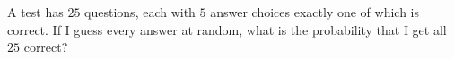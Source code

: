 A test has $25$ questions, each with $5$ answer choices exactly one of which is correct. If I guess every answer at random, what is the probability that I get all $25$ correct?
